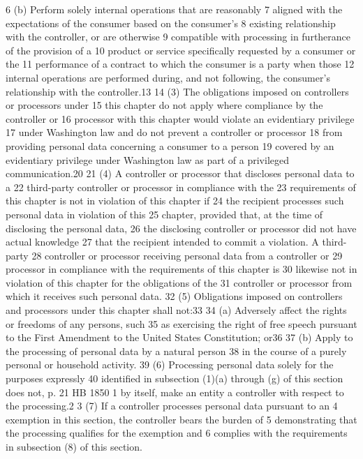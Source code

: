 6 (b) Perform solely internal operations that are reasonably
7 aligned with the expectations of the consumer based on the consumer's
8 existing relationship with the controller, or are otherwise
9 compatible with processing in furtherance of the provision of a
10 product or service specifically requested by a consumer or the
11 performance of a contract to which the consumer is a party when those
12 internal operations are performed during, and not following, the
consumer's relationship with the controller.13
14 (3) The obligations imposed on controllers or processors under
15 this chapter do not apply where compliance by the controller or
16 processor with this chapter would violate an evidentiary privilege
17 under Washington law and do not prevent a controller or processor
18 from providing personal data concerning a consumer to a person
19 covered by an evidentiary privilege under Washington law as part of a
privileged communication.20
21 (4) A controller or processor that discloses personal data to a
22 third-party controller or processor in compliance with the
23 requirements of this chapter is not in violation of this chapter if
24 the recipient processes such personal data in violation of this
25 chapter, provided that, at the time of disclosing the personal data,
26 the disclosing controller or processor did not have actual knowledge
27 that the recipient intended to commit a violation. A third-party
28 controller or processor receiving personal data from a controller or
29 processor in compliance with the requirements of this chapter is
30 likewise not in violation of this chapter for the obligations of the
31 controller or processor from which it receives such personal data.
32 (5) Obligations imposed on controllers and processors under this
chapter shall not:33
34 (a) Adversely affect the rights or freedoms of any persons, such
35 as exercising the right of free speech pursuant to the First
Amendment to the United States Constitution; or36
37 (b) Apply to the processing of personal data by a natural person
38 in the course of a purely personal or household activity.
39 (6) Processing personal data solely for the purposes expressly
40 identified in subsection (1)(a) through (g) of this section does not,
p. 21 HB 1850
1 by itself, make an entity a controller with respect to the
processing.2
3 (7) If a controller processes personal data pursuant to an
4 exemption in this section, the controller bears the burden of
5 demonstrating that the processing qualifies for the exemption and
6 complies with the requirements in subsection (8) of this section.
